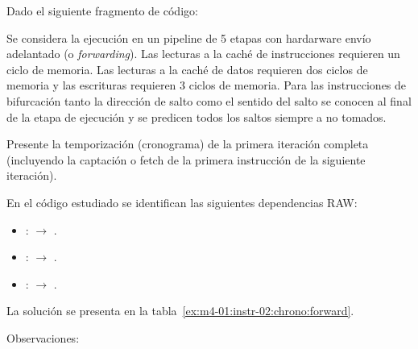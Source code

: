 \begin{acexercise}\end{acexercise}

Dado el siguiente fragmento de código:



Se considera la ejecución en un pipeline de 5 etapas con hardarware envío adelantado
(o \emph{forwarding}). Las lecturas a la caché de instrucciones requieren un ciclo de
memoria. Las lecturas a la caché de datos requieren dos ciclos de memoria y las
escrituras requieren 3 ciclos de memoria. Para las instrucciones de bifurcación
tanto la dirección de salto como el sentido del salto se conocen al final de la
etapa de ejecución y se predicen todos los saltos siempre a no tomados.

Presente la temporización (cronograma) de la primera iteración completa (incluyendo la captación o fetch
de la primera instrucción de la siguiente iteración).

\begin{acsolution}\end{acsolution}

En el código estudiado se identifican las siguientes dependencias RAW:
\begin{itemize}
  \item {}:  $\rightarrow$ .
  \item {}:  $\rightarrow$ .
  \item {}:  $\rightarrow$ .
\end{itemize}

La solución se presenta en la tabla~\ref{ex:m4-01:instr-02:chrono:forward}.

Observaciones:

